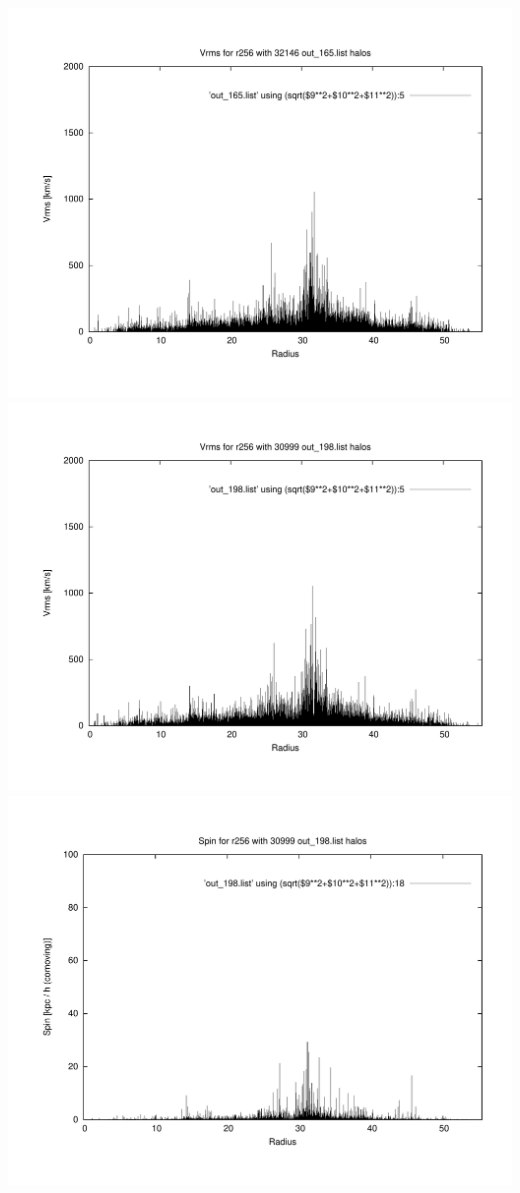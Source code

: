 \includegraphics[scale=0.3]{r256/stages14_ling/plot_Vrms_out_165.pdf}
\includegraphics[scale=0.3]{r256/stages14_ling/plot_Vrms_out_198.pdf}
\includegraphics[scale=0.3]{r256/stages14_ling/plot_spin_out_198.pdf}

